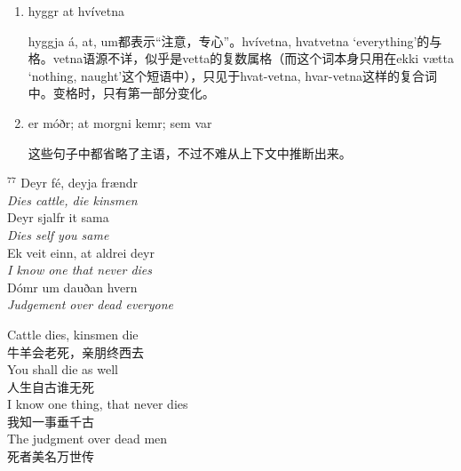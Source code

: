 \begin{grammar*}{}
    \begin{enumerate}[leftmargin=*]

        \item hyggr at hvívetna

              hyggja {\'a}, at, um都表示“注意，专心”。hvívetna, hvatvetna `everything'的与格。vetna语源不详，似乎是vetta的复数属格（而这个词本身只用在ekki vætta `nothing, naught'这个短语中），只见于hvat-vetna, hvar-vetna这样的复合词中。变格时，只有第一部分变化。

        \item er móðr; at morgni kemr; sem var

              这些句子中都省略了主语，不过不难从上下文中推断出来。
    \end{enumerate}
\end{grammar*}
\medskip %
\begin{paracol}{2}
    \noindent
    $^{77}$ Deyr fé, deyja frændr\\
    \textit{Dies cattle, die kinsmen}\\
    Deyr sjalfr it sama\\
    \textit{Dies self you same}\\
    Ek veit einn, at aldrei deyr\\
    \textit{I know one that never dies}\\
    Dómr um dauðan hvern\\
    \textit{Judgement over dead everyone}\\
    \switchcolumn

    \noindent
    Cattle dies, kinsmen die\\
    牛羊会老死，亲朋终西去\\
    You shall die as well\\
    人生自古谁无死\\
    I know one thing, that never dies\\
    我知一事垂千古\\
    The judgment over dead men\\
    死者美名万世传\\

\end{paracol}

